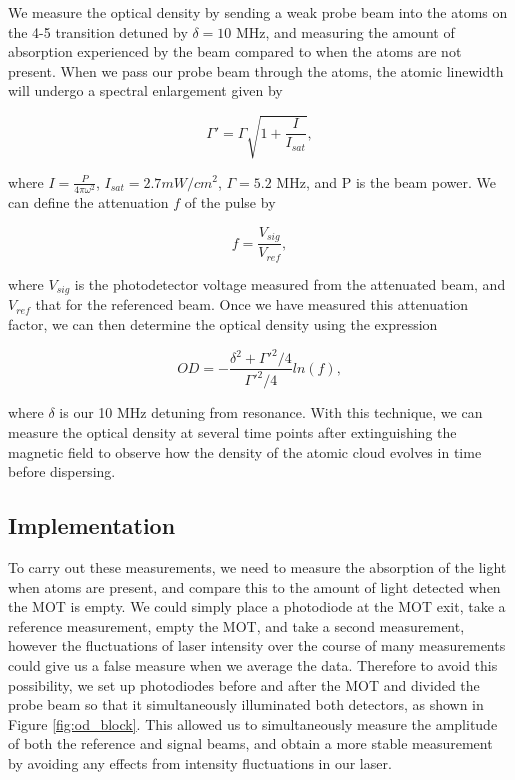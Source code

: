 We measure the optical density by sending a weak probe beam into the atoms on the 4-5 transition detuned by $\delta=10$ MHz, and measuring the amount of absorption experienced by the beam compared to when the atoms are not present.  When we pass our probe beam through the atoms, the atomic linewidth will undergo a spectral enlargement given by 


\begin{equation}
  \label{eq:spectral_enlargment}
  \Gamma' = \Gamma \sqrt{1+\frac{I}{I_{sat}}}, 
\end{equation}

\noindent
where $I=\frac{P}{4 \pi \omega^2}$, $I_{sat}=2.7 mW/cm^2$, $\Gamma=5.2$ MHz, and P is the beam power.  We can define the attenuation $f$ of the pulse by 

\begin{equation}
  \label{eq:attenuation}
  f = \frac{V_{sig}}{V_{ref}},
\end{equation}

\noindent
where $V_{sig}$ is the photodetector voltage measured from the attenuated beam, and $V_{ref}$ that for the referenced beam.  Once we have measured this attenuation factor, we can then determine the optical density using the expression 


\begin{equation}
  \label{eq:optical_density}
  OD = - \frac{\delta^2 + \Gamma'^2 /4}{\Gamma'^2/4} ln(f),
\end{equation}



\noindent 
where $\delta$ is our 10 MHz detuning from resonance.  With this technique, we can measure the optical density at several time points after extinguishing the magnetic field to observe how the density of the atomic cloud evolves in time before dispersing.


\subsection{Implementation} 

To carry out these measurements, we need to measure the absorption of the light when atoms are present, and compare this to the amount of light detected when the MOT is empty.  We could simply place a photodiode at the MOT exit, take a reference measurement, empty the MOT, and take a second measurement, however the fluctuations of laser intensity over the course of many measurements could give us a false measure when we average the data.  Therefore to avoid this possibility, we set up photodiodes before and after the MOT and divided the probe beam so that it simultaneously illuminated both detectors, as shown in Figure \ref{fig:od_block}.  This allowed us to simultaneously measure the amplitude of both the reference and signal beams, and obtain a more stable measurement by avoiding any effects from intensity fluctuations in our laser.  

